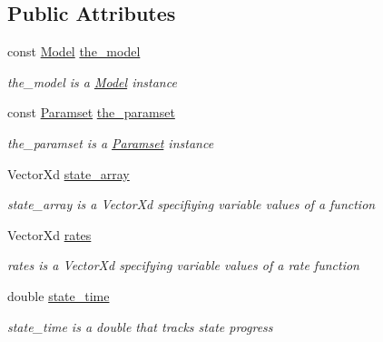 \subsection*{Public Attributes}
\begin{DoxyCompactItemize}
\item 
\mbox{\label{class_realization_aaf38f4ab6d7286c35942308bc78b38db}} 
const \hyperlink{class_model}{Model} \hyperlink{class_realization_aaf38f4ab6d7286c35942308bc78b38db}{the\+\_\+model}
\begin{DoxyCompactList}\small\item\em the\+\_\+model is a \hyperlink{class_model}{Model} instance \end{DoxyCompactList}\item 
\mbox{\label{class_realization_a119bb29de88929bc51bc1b329473a94b}} 
const \hyperlink{class_paramset}{Paramset} \hyperlink{class_realization_a119bb29de88929bc51bc1b329473a94b}{the\+\_\+paramset}
\begin{DoxyCompactList}\small\item\em the\+\_\+paramset is a \hyperlink{class_paramset}{Paramset} instance \end{DoxyCompactList}\item 
\mbox{\label{class_realization_a2ab61502cfab8dfe643d976d735163a9}} 
Vector\+Xd \hyperlink{class_realization_a2ab61502cfab8dfe643d976d735163a9}{state\+\_\+array}
\begin{DoxyCompactList}\small\item\em state\+\_\+array is a Vector\+Xd specifiying variable values of a function \end{DoxyCompactList}\item 
\mbox{\label{class_realization_ae91425d8eacea1f0374b8f0f7f57347b}} 
Vector\+Xd \hyperlink{class_realization_ae91425d8eacea1f0374b8f0f7f57347b}{rates}
\begin{DoxyCompactList}\small\item\em rates is a Vector\+Xd specifying variable values of a rate function \end{DoxyCompactList}\item 
\mbox{\label{class_realization_a7c4def45c4833072317517b71e723793}} 
double \hyperlink{class_realization_a7c4def45c4833072317517b71e723793}{state\+\_\+time}
\begin{DoxyCompactList}\small\item\em state\+\_\+time is a double that tracks state progress \end{DoxyCompactList}\end{DoxyCompactItemize}


